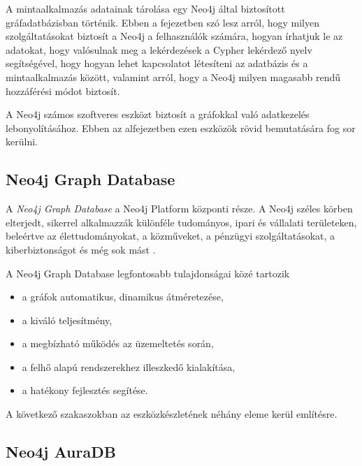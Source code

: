 
A mintaalkalmazás adatainak tárolása egy Neo4j által biztosított gráfadatbázisban történik. Ebben a fejezetben szó lesz arról, hogy milyen szolgáltatásokat biztosít a Neo4j a felhasználók számára, hogyan írhatjuk le az adatokat, hogy valósulnak meg a lekérdezések a Cypher lekérdező nyelv segítségével, hogy hogyan lehet kapcsolatot létesíteni az adatbázis és a mintaalkalmazás között, valamint arról, hogy a Neo4j milyen magasabb rendű hozzáférési módot biztosít.


A Neo4j számos szoftveres eszközt biztosít a gráfokkal való adatkezelés lebonyolításához. Ebben az alfejezetben ezen eszközök rövid bemutatására fog sor kerülni.

\subsection{Neo4j Graph Database}

A \textit{Neo4j Graph Database} a Neo4j Platform központi része. A Neo4j széles körben elterjedt, sikerrel alkalmazzák különféle tudományos, ipari és vállalati területeken, beleértve az élettudományokat, a közműveket, a pénzügyi szolgáltatásokat, a kiberbiztonságot és még sok mást \cite{neo4j-graph-database}.

A Neo4j Graph Database legfontosabb tulajdonságai közé tartozik
\begin{itemize}
      \item a gráfok automatikus, dinamikus átméretezése,
      \item a kiváló teljesítmény,
      \item a megbízható működés az üzemeltetés során,
      \item a felhő alapú rendszerekhez illeszkedő kialakítása, 
      \item a hatékony fejlesztés segítése.
\end{itemize}
A következő szakaszokban az eszközkészletének néhány eleme kerül említésre.

\subsection{Neo4j AuraDB}


